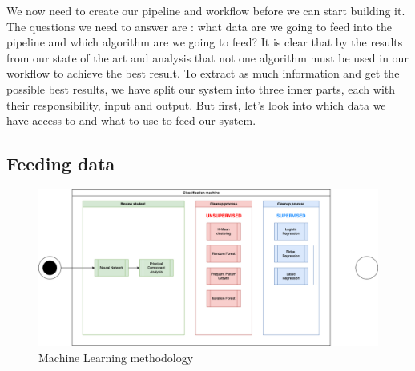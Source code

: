 \documentclass[../main.tex]{subfiles}
\begin{document}
We now need to create our pipeline and workflow before we can start building it. The questions we need to answer are : what data are we going to feed into the pipeline and which algorithm are we going to feed?
It is clear that by the results from our state of the art and analysis that not one algorithm must be used in our workflow to achieve the best result. 
To extract as much information and get the possible best results, we have split our system into three inner parts, each with their responsibility, input and output.
But first, let's look into which data we have access to and what to use to feed our system.

\subsection{Feeding data}
\label{subsec:conceptualimplementation_feedingdata}

\begin{figure}
    \centering
    \includegraphics[width=\textwidth]{res//diagram/ML Workflow.png}
    \caption{Machine Learning methodology}
    \label{fig:Machine workflow}
\end{figure}
\end{document}
